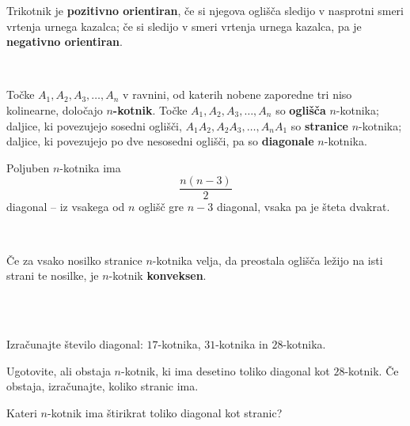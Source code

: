             
                Trikotnik je \textbf{pozitivno orientiran}, če si njegova oglišča sledijo v nasprotni smeri vrtenja urnega kazalca; 
                če si sledijo v smeri vrtenja urnega kazalca, pa je \textbf{negativno orientiran}.
            
        
            ~

        
            \begin{definicija}
                Točke $A_1, A_2, A_3, \dots, A_n$ v ravnini, od katerih nobene zaporedne tri niso kolinearne, določajo \textbf{$n$-kotnik}.
                Točke $A_1, A_2, A_3, \dots, A_n$ so \textbf{oglišča} $n$-kotnika;
                daljice, ki povezujejo sosedni oglišči, $A_1A_2, A_2A_3, \dots, A_nA_1$ so \textbf{stranice} $n$-kotnika;
                daljice, ki povezujejo po dve nesosedni oglišči, pa so \textbf{diagonale} $n$-kotnika.
            \end{definicija}

            
                Poljuben $n$-kotnika ima $$\dfrac{n(n-3)}{2}$$ diagonal -- iz vsakega od $n$ oglišč gre $n-3$ diagonal, vsaka pa je šteta dvakrat.
            
            ~
            
                Če za vsako nosilko stranice $n$-kotnika velja, da preostala oglišča ležijo na isti strani te nosilke, je $n$-kotnik \textbf{konveksen}.
            
        





        ~\\~\\

            \begin{naloga}
                Izračunajte število diagonal: $17$-kotnika, $31$-kotnika in $28$-kotnika.                
            \end{naloga}

            \begin{naloga}
                Ugotovite, ali obstaja $n$-kotnik, ki ima desetino toliko diagonal kot $28$-kotnik.
                Če obstaja, izračunajte, koliko stranic ima.
            \end{naloga}   
            
            \begin{naloga}
                Kateri $n$-kotnik ima štirikrat toliko diagonal kot stranic?
            \end{naloga}
        
